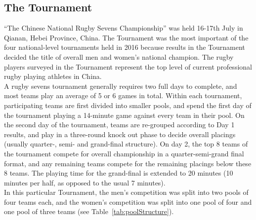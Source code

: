 \documentclass[12pt]{report}
\begin{document}
  \subsection{The Tournament}
``The Chinese National Rugby Sevens Championship'' was held 16-17th July in Qianan, Hebei Province, China. The Tournament was the most important of the four national-level tournaments held in 2016 because results in the Tournament decided the title of overall men and women’s national champion. The rugby players surveyed in the Tournament represent the top level of current professional rugby playing athletes in China. \\

A rugby sevens tournament generally requires two full days to complete, and most teams play an average of 5 or 6 games in total. Within each tournament, participating teams are first divided into smaller pools, and spend the first day of the tournament playing a 14-minute game against every team in their pool. On the second day of the tournament, teams are re-grouped according to Day 1 results, and play in a three-round knock out phase to decide overall placings (usually quarter-, semi- and grand-final structure). On day 2, the top 8 teams of the tournament compete for overall championship in a quarter-semi-grand final format, and any remaining teams compete for the remaining placings below these 8 teams. The playing time for the grand-final is extended to 20 minutes (10 minutes per half, as opposed to the usual 7 minutes). \\

In this particular Tournament, the men’s competition was split into two pools of four teams each, and the women’s competition was split into one pool of four and one pool of three teams (see Table~\ref{tab:poolStructure}). \\
\end{document}
